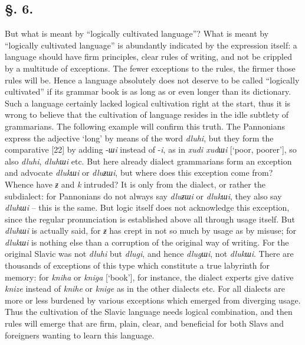 \subsection*{\hspace*{\fill}§. 6.\hspace*{\fill}}

But what is meant by “logically cultivated language”? What is meant by “logically cultivated language” is abundantly indicated by the expression itself: a language should have firm principles, clear rules of writing, and not be crippled by a multitude of exceptions. The fewer exceptions to the rules, the firmer those rules will be. Hence a language absolutely does not deserve to be called “logically cultivated” if its grammar book is as long as or even longer than its dictionary. Such a language certainly lacked logical cultivation right at the start, thus it is wrong to believe that the cultivation of language resides in the idle subtlety of grammarians. The following example will confirm this truth. The Pannonians express the adjective ‘long’ by means of the word \textit{dluhi}, but they form the comparative [22] by adding -\textit{шi} instead of -\textit{i}, as in \textit{xudi xudшi} [‘poor, poorer’], so also \textit{dluhi}, \textit{dluhшi} etc. But here already dialect grammarians form an exception and advocate \textit{dlukшi} or \textit{dluƶшi}, but where does this exception come from? Whence have \textit{ƶ} and \textit{k} intruded? It is only from the dialect, or rather the subdialect: for Pannonians do not always say \textit{dluƶшi} or \textit{dlukшi}, they also say \textit{dluhшi} -- this is the same. But logic itself does not acknowledge this exception, since the regular pronunciation is established above all through usage itself. But \textit{dluhшi} is actually said, for \textit{ƶ} has crept in not so much by usage as by misuse; for \textit{dlukшi} is nothing else than a corruption of the original way of writing. For the original Slavic was not \textit{dluhi} but \textit{dlugi}, and hence \textit{dlugшi}, not \textit{dlukшi}. There are thousands of exceptions of this type which constitute a true labyrinth for memory: for \textit{kniha} or \textit{kniga} [‘book’], for instance, the dialect experts give dative \textit{knize} instead of \textit{knihe} or \textit{knige} as in the other dialects etc. For all dialects are more or less burdened by various exceptions which emerged from diverging usage. Thus the cultivation of the Slavic language needs logical combination, and then rules will emerge that are firm, plain, clear, and beneficial for both Slavs and foreigners wanting to learn this language.

